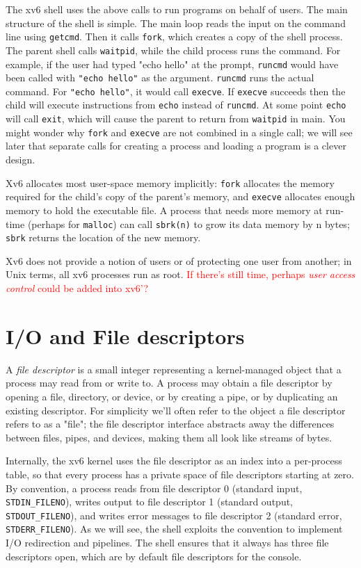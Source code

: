 \documentclass{report}
\begin{document}
	The xv6 shell uses the above calls to run programs on behalf of users. The main
	structure of the shell is simple. The main loop reads the input on the
	command line using \texttt{getcmd}. Then it calls \texttt{fork}, which creates a 
	copy of the shell process. The parent shell calls \texttt{waitpid}, while the child process 
	runs the command. For 
	example, if the user had typed "echo hello" at the prompt, \texttt{runcmd} would have been
	called with \texttt{"echo hello"} as the argument. \texttt{runcmd} runs the actual command.
	For \texttt{"echo hello"}, it would call \texttt{execve}. If \texttt{execve} succeeds 
	then the child will execute 
	instructions from \texttt{echo} instead of \texttt{runcmd}. At some point \texttt{echo} will call 
	\texttt{exit},
	which will cause the parent to return from \texttt{waitpid} in main. You might wonder
	why \texttt{fork} and \texttt{execve} are not combined in a single call; we will see later that separate
	calls for creating a process and loading a program is a clever design.
	
	Xv6 allocates most user-space memory implicitly: \texttt{fork} allocates the memory 
	required for the child's copy of the parent's memory, and \texttt{execve} allocates enough memory
	to hold the executable file. A process that needs more memory at run-time (perhaps
	for \texttt{malloc}) can call \texttt{sbrk(n)} to grow its data memory by n bytes; 
	\texttt{sbrk} returns the location of the new memory.
	
	Xv6 does not provide a notion of users or of protecting one user from another; in
	Unix terms, all xv6 processes run as root. \textcolor{red}{
		If there's still time, perhaps \emph{user access control} could be added into xv6'?
	}
	
	\section{I/O and File descriptors}
	A \emph{file descriptor} is a small integer representing a kernel-managed object that
	a process may read from or write to. A process may obtain a file descriptor by opening 
	a file, directory, or device, or by creating a pipe, or by duplicating an existing 
	descriptor. For simplicity we'll often refer to the object a file descriptor refers to as a
	"file"; the file descriptor interface abstracts away the differences between files, pipes,
	and devices, making them all look like streams of bytes.
	
	Internally, the xv6 kernel uses the file descriptor as an index into a per-process table, 
	so that every process has a private space of file descriptors starting at zero. By
	convention, a process reads from file descriptor 0 (standard input, \texttt{STDIN\_FILENO}), 
	writes output to file descriptor 1 (standard output, \texttt{STDOUT\_FILENO}), 
	and writes error messages to file descriptor 2 (standard
	error, \texttt{STDERR\_FILENO}). As we will see, the shell exploits the convention to 
	implement I/O redirection
	and pipelines. The shell ensures that it always has three file descriptors open,
	which are by default file descriptors for the console.
	
\end{document}
